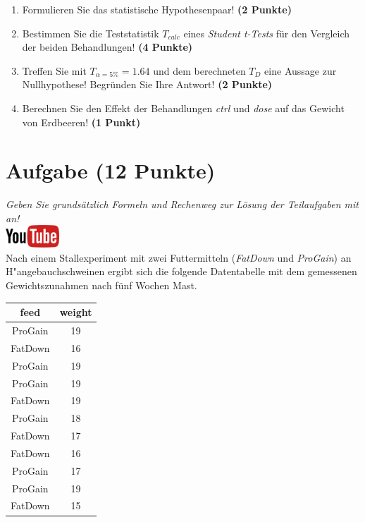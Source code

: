 \documentclass[a4paper, 9pt]{scrartcl}\usepackage[]{graphicx}\usepackage[]{xcolor}
\begin{document}
\begin{enumerate}
  \item Formulieren Sie das statistische Hypothesenpaar! \textbf{(2
      Punkte)}
  \item Bestimmen Sie die Teststatistik $T_{calc}$ eines
    \textit{Student t-Tests} f{\"u}r den Vergleich der beiden Behandlungen!
    \textbf{(4 Punkte)}
\item Treffen Sie mit $T_{\alpha = 5\%} = 1.64$ und dem
  berechneten $T_{D}$ eine Aussage zur Nullhypothese! Begr{\"u}nden Sie Ihre
  Antwort!  \textbf{(2 Punkte)}
\item Berechnen Sie den Effekt der Behandlungen \textit{ctrl} und
  \textit{dose} auf das Gewicht von Erdbeeren! \textbf{(1 Punkt)}
\end{enumerate} 
\clearpage

\section{Aufgabe \hfill (12 Punkte)}

\textit{Geben Sie grunds{\"a}tzlich Formeln und Rechenweg zur L{\"o}sung der
  Teilaufgaben mit an!} \\[1Ex]

\hfill\href{https://youtu.be/TbSEOMCQYl4}{\includegraphics[width =
  2cm]{img/youtube}}\\[1Ex]



Nach einem Stallexperiment mit zwei Futtermitteln (\textit{FatDown} und
\textit{ProGain}) an H{"a}ngebauchschweinen ergibt sich die folgende Datentabelle
mit dem gemessenen Gewichtszunahmen nach f{\"u}nf Wochen Mast.

\begin{table}[!h]
\centering
\begin{tabular}{cc}
\toprule
feed & weight\\
\midrule
ProGain & 19\\
FatDown & 16\\
ProGain & 19\\
ProGain & 19\\
FatDown & 19\\
\addlinespace
ProGain & 18\\
FatDown & 17\\
FatDown & 16\\
ProGain & 17\\
ProGain & 19\\
\addlinespace
FatDown & 15\\
\bottomrule
\end{tabular}
\end{table}
\end{document}
